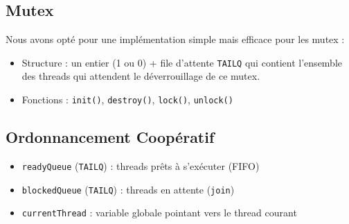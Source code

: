 \subsection{Mutex}
Nous avons opté pour une implémentation simple mais efficace pour les mutex :
\begin{itemize}
    \item Structure : un entier (1 ou 0) + file d'attente \texttt{TAILQ} qui
    contient l'ensemble des threads qui attendent le déverrouillage de ce mutex.
    \item Fonctions : \texttt{init()}, \texttt{destroy()}, \texttt{lock()}, \texttt{unlock()}
\end{itemize}

\subsection{Ordonnancement Coopératif}
\begin{itemize}
    \item \texttt{readyQueue} (\texttt{TAILQ}) : threads prêts à s'exécuter (FIFO)
    \item \texttt{blockedQueue} (\texttt{TAILQ}) : threads en attente (\texttt{join})
    \item \texttt{currentThread} : variable globale pointant vers le thread courant
\end{itemize}
